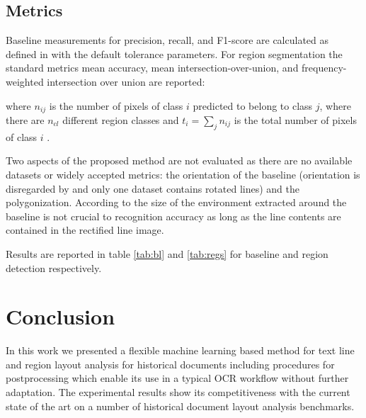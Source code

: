 \subsection{Metrics}

Baseline measurements for precision, recall, and F1-score are calculated as
defined in \cite{gruning2018read} with the default tolerance parameters. For
region segmentation the standard metrics mean accuracy, mean
intersection-over-union, and frequency-weighted intersection over union are
reported:


where $n_{ij}$ is the number of pixels of class $i$ predicted to belong to
class $j$, where there are $n_{cl}$ different region classes and $t_i = \sum_j
n_{ij}$ is the total number of pixels of class $i$ \cite{long2015fully}.

Two aspects of the proposed method are not evaluated as there are no available
datasets or widely accepted metrics: the orientation of the baseline
(orientation is disregarded by \cite{gruning2018read} and only one dataset
contains rotated lines) and the polygonization. According to
\cite{romero2015influence} the size of the environment extracted around the
baseline is not crucial to recognition accuracy as long as the line contents
are contained in the rectified line image.

Results are reported in table \ref{tab:bl} and \ref{tab:regs} for baseline
and region detection respectively.

\section{Conclusion}

In this work we presented a flexible machine learning based method for text
line and region layout analysis for historical documents including procedures
for postprocessing which enable its use in a typical OCR workflow without
further adaptation. The experimental results show its competitiveness with the
current state of the art on a number of historical document layout analysis
benchmarks.
